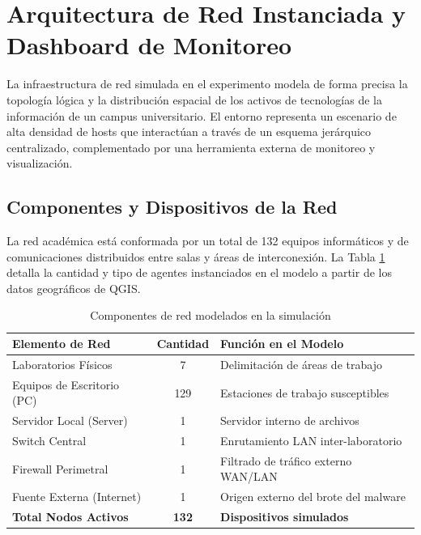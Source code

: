 \section{Arquitectura de Red Instanciada y Dashboard de Monitoreo}
\label{sec:arquitectura}
La infraestructura de red simulada en el experimento modela de forma precisa la topología lógica y la distribución espacial de los activos de tecnologías de la información de un campus universitario. El entorno representa un escenario de alta densidad de hosts que interactúan a través de un esquema jerárquico centralizado, complementado por una herramienta externa de monitoreo y visualización.

\subsection{Componentes y Dispositivos de la Red}
La red académica está conformada por un total de 132 equipos informáticos y de comunicaciones distribuidos entre salas y áreas de interconexión. La Tabla \ref{tab:dispositivos} detalla la cantidad y tipo de agentes instanciados en el modelo a partir de los datos geográficos de QGIS.

\begin{table}[htbp]
\caption{Componentes de red modelados en la simulación}
\label{tab:dispositivos}
\begin{center}
\begin{tabular}{|p{}|c|p{}|}
\hline
\textbf{Elemento de Red} & \textbf{Cantidad} & \textbf{Función en el Modelo} \\ \hline
Laboratorios Físicos & 7 & Delimitación de áreas de trabajo \\ \hline
Equipos de Escritorio (PC) & 129 & Estaciones de trabajo susceptibles \\ \hline
Servidor Local (Server) & 1 & Servidor interno de archivos \\ \hline
Switch Central & 1 & Enrutamiento LAN inter-laboratorio \\ \hline
Firewall Perimetral & 1 & Filtrado de tráfico externo WAN/LAN \\ \hline
Fuente Externa (Internet) & 1 & Origen externo del brote del malware \\ \hline
\textbf{Total Nodos Activos} & \textbf{132} & \textbf{Dispositivos simulados} \\ \hline
\end{tabular}
\end{center}
\end{table}

